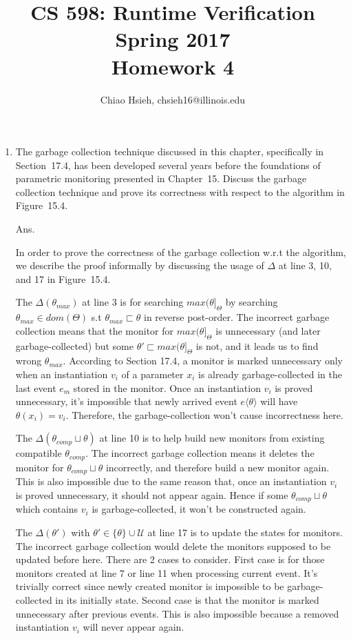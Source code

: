 \documentclass{article}
\title{\Large\bfseries CS 598: Runtime Verification \\
Spring 2017 \\
Homework 4}
\author{Chiao Hsieh, chsieh16@illinois.edu}
\begin{document}
\maketitle

\begin{enumerate}

\item The garbage collection technique discussed in this chapter, specifically in Section~17.4,
has been developed several years before the foundations of parametric monitoring presented in Chapter~15.
Discuss the garbage collection technique and prove its correctness with respect to the algorithm in Figure~15.4.

Ans.

In order to prove the correctness of the garbage collection w.r.t the algorithm,
we describe the proof informally by discussing the usage of $\Delta$ at line 3,
10, and 17 in Figure~15.4.

\newcommand{\pmapsto}{\ensuremath{\rightharpoondown}}

The $\Delta(\theta_{max})$ at line 3 is for searching $max(\theta]_{\Theta}$
by searching $\theta_{max} \in dom(\Theta)$ s.t $\theta_{max} \sqsubset \theta$ in reverse post-order.
The incorrect garbage collection means that the monitor for $max(\theta]_{\Theta}$
is unnecessary (and later garbage-collected) but some 
$\theta' \sqsubset max(\theta]_{\Theta}$ is not,
and it leads us to find wrong $\theta_{max}$. 
According to Section 17.4, a monitor is marked unnecessary only when an instantiation
$v_i$ of a parameter $x_i$ is already garbage-collected in the last event $e_m$
stored in the monitor.
Once an instantiation $v_i$ is proved unnecessary,
it's impossible that newly arrived event $e\langle\theta\rangle$ will have
$\theta(x_i) = v_i$.
Therefore, the garbage-collection won't cause incorrectness here.

The $\Delta(\theta_{comp} \sqcup \theta)$ at line 10 is to help build new monitors
from existing compatible $\theta_{comp}$.
The incorrect garbage collection means it deletes the monitor for
$\theta_{comp} \sqcup \theta$ incorrectly, and therefore build a new monitor again.
This is also impossible due to the same reason that,
once an instantiation $v_i$ is proved unnecessary, it should not appear again.
Hence if some $\theta_{comp} \sqcup \theta$ which contains $v_i$ is
garbage-collected, it won't be constructed again.

The $\Delta(\theta')$ with $\theta' \in \{\theta\} \cup \mathcal{U}$ at line 17
is to update the states for monitors.
The incorrect garbage collection would delete the monitors supposed to be updated
before here.
There are 2 cases to consider. First case is for those monitors created at line 7
or line 11 when processing current event.
It's trivially correct since newly created monitor is impossible to be 
garbage-collected in its initially state.
Second case is that the monitor is marked unnecessary after previous events.
This is also impossible because a removed instantiation $v_i$ will never
appear again.


\end{enumerate}
\end{document}
